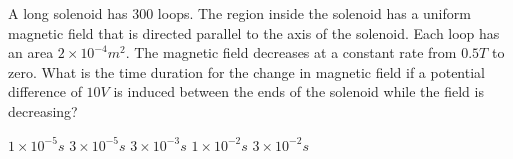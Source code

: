 \begin{questions}\setcounter{question}{22}\question
A long solenoid has 300 loops. The region inside the solenoid has a uniform magnetic field that is directed parallel to the axis of the solenoid. Each loop has an area $2 \times 10^{-4} \unit{m^2}$. The magnetic field decreases at a constant rate from $0.5 \unit{T}$ to zero. What is the time duration for the change in magnetic field if a potential difference of $10 \unit{V}$ is induced between the ends of the solenoid while the field is decreasing?

\begin{oneparchoices}
\choice $1 \times 10^{-5} \unit{s}$
\choice $3 \times 10^{-5} \unit{s}$
\choice $3 \times 10^{-3} \unit{s}$
\choice $1 \times 10^{-2} \unit{s}$
\choice $3 \times 10^{-2} \unit{s}$
\end{oneparchoices}\end{questions}
